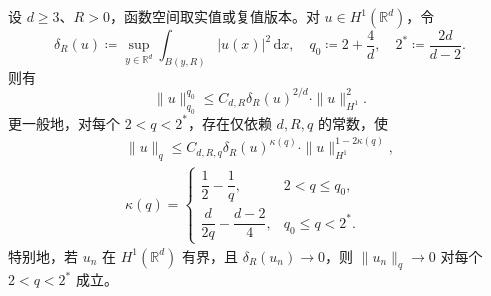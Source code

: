 \begin{lemma}
\label{b2:lem:F-vanishing}
设 \(d\ge3\)、\(R>0\)，函数空间取实值或复值版本。对 \(u\in H^1(\mathbb R^d)\)，令
\[
 \delta_R(u)\coloneqq
 \sup_{y\in\mathbb R^d}\int_{B(y,R)}|u(x)|^2\,\mathrm{d}x,
 \quad q_0\coloneqq2+\frac4d,
 \quad 2^*\coloneqq\frac{2d}{d-2}.
\]
则有
\begin{equation}
\label{b2:eq:F-vanishing-base}
 \|u\|_{q_0}^{q_0}
 \le C_{d,R}\delta_R(u)^{2/d}\cdot\|u\|_{H^1}^2.
\end{equation}
更一般地，对每个 \(2<q<2^*\)，存在仅依赖 \(d,R,q\) 的常数，使
\begin{equation}
\label{b2:eq:F-vanishing-quantitative}
 \begin{gathered}
 \|u\|_q\le C_{d,R,q}\delta_R(u)^{\kappa(q)}
              \cdot\|u\|_{H^1}^{1-2\kappa(q)},\\
 \kappa(q)=
 \begin{cases}
  \dfrac12-\dfrac1q,&2<q\le q_0,\\[3pt]
  \dfrac d{2q}-\dfrac{d-2}{4},&q_0\le q<2^*.
 \end{cases}
 \end{gathered}
\end{equation}
特别地，若 \(u_n\) 在 \(H^1(\mathbb R^d)\) 有界，且 \(\delta_R(u_n)\to0\)，则 \(\|u_n\|_q\to0\) 对每个 \(2<q<2^*\) 成立。
\end{lemma}
